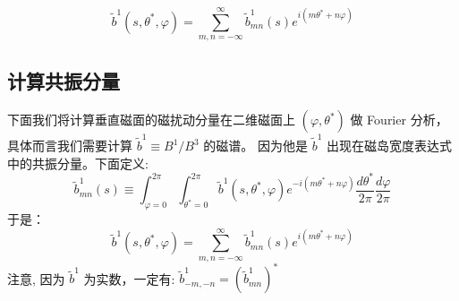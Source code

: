 \begin{equation}
  \tilde{b}^{1}\left(s, \theta^{*}, \varphi\right)=\sum_{m, n=-\infty}^{\infty} \tilde{b}_{m n}^{1}(s) e^{i\left(m \theta^{*}+n \varphi\right)}
\end{equation}

  
\subsection{计算共振分量}

下面我们将计算垂直磁面的磁扰动分量在二维磁面上 $(\varphi, \theta^{*})$ 做 Fourier 分析，具体而言我们需要计算 $\tilde{b}^{1} \equiv B^{1} / B^{3}$ 的磁谱。
因为他是 $\tilde{b}^{1}$ 出现在磁岛宽度表达式中的共振分量。下面定义:
\[
\tilde{b}_{m n}^{1}(s) \equiv \int_{\varphi=0}^{2 \pi} \int_{\theta^{*}=0}^{2 \pi} \tilde{b}^{1}\left(s, \theta^{*}, \varphi\right) e^{-i\left(m \theta^{*}+n \varphi\right)} \frac{d \theta^{*}}{2 \pi} \frac{d \varphi}{2 \pi}
\]
于是：
\[
\tilde{b}^{1}\left(s, \theta^{*}, \varphi\right)=\sum_{m, n=-\infty}^{\infty} \tilde{b}_{m n}^{1}(s) e^{i\left(m \theta^{*}+n \varphi\right)}
\]
注意, 因为 $\tilde{b}^{1}$ 为实数，一定有:
$\tilde{b}_{-m,-n}^{1}=\left(\tilde{b}_{m n}^{1}\right)^{*}$


